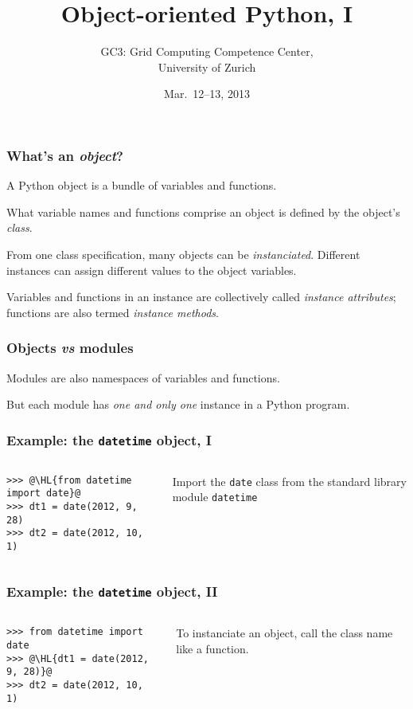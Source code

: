 \documentclass[english,serif,mathserif,xcolor=pdftex,dvipsnames,table]{beamer}
\title[OOP]{%
  Object-oriented Python, I
}
\author[GC3]{%
  GC3: Grid Computing Competence Center, \\
  University of Zurich
}
\date{Mar.~12--13, 2013}
\begin{document}
\maketitle


\begin{frame}
  \frametitle{What's an \emph{object}?}
  A Python object is a bundle of variables and functions.

  \+
  What variable names and functions comprise an object is defined
  by the object's \emph{class}.

  \+
  From one class specification, many objects can be
  \emph{instanciated}.  Different instances can assign different
  values to the object variables.

  \+
  Variables and functions in an instance are collectively called
  \emph{instance attributes}; functions are also termed \emph{instance
    methods}.
\end{frame}


\begin{frame}
  \frametitle{Objects \emph{vs} modules}

  Modules are also namespaces of variables and functions.

  \+
  But each module has \emph{one and only one} instance in a Python
  program.
\end{frame}


\begin{frame}[fragile]
  \frametitle{Example: the \texttt{datetime} object, I}
  \begin{columns}[c]
    \begin{column}{0.5\textwidth}
\begin{lstlisting}
>>> @\HL{from datetime import date}@
>>> dt1 = date(2012, 9, 28)
>>> dt2 = date(2012, 10, 1)
\end{lstlisting}
    \end{column}
    \begin{column}{0.45\textwidth}
      \raggedleft
      Import the \texttt{date} class from the standard
      library module \texttt{datetime}
    \end{column}
  \end{columns}
\end{frame}


\begin{frame}[fragile]
  \frametitle{Example: the \texttt{datetime} object, II}
  \begin{columns}[c]
    \begin{column}{0.5\textwidth}
\begin{lstlisting}
>>> from datetime import date
>>> @\HL{dt1 = date(2012, 9, 28)}@
>>> dt2 = date(2012, 10, 1)
\end{lstlisting}
    \end{column}
    \begin{column}{0.5\textwidth}
      \raggedleft
      To instanciate an object, call the class name like a
      function.
    \end{column}
  \end{columns}
\end{frame}
\end{document}
